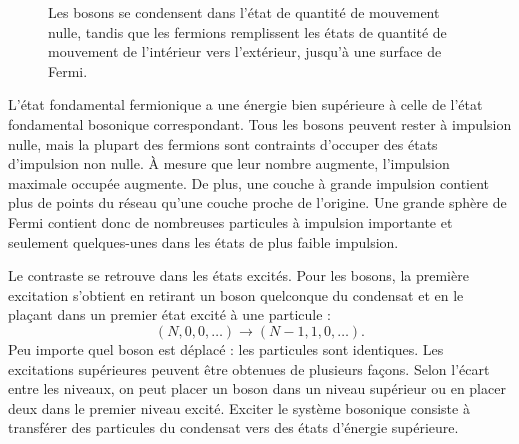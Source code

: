 \begin{figure}
\centering
{}
\caption{Les bosons se condensent dans l’état de quantité de mouvement nulle, tandis que les fermions remplissent les états de quantité de mouvement de l’intérieur vers l’extérieur, jusqu’à une surface de Fermi.}
\end{figure}

L’état fondamental fermionique a une énergie bien supérieure à celle de l’état fondamental bosonique correspondant. Tous les bosons peuvent rester à impulsion nulle, mais la plupart des fermions sont contraints d’occuper des états d’impulsion non nulle. À mesure que leur nombre augmente, l’impulsion maximale occupée augmente. De plus, une couche à grande impulsion contient plus de points du réseau qu’une couche proche de l’origine. Une grande sphère de Fermi contient donc de nombreuses particules à impulsion importante et seulement quelques-unes dans les états de plus faible impulsion.

Le contraste se retrouve dans les états excités. Pour les bosons, la première excitation s’obtient en retirant un boson quelconque du condensat et en le plaçant dans un premier état excité à une particule :
\begin{equation}
(N,0,0,\ldots)\longrightarrow (N-1,1,0,\ldots).
\end{equation}
Peu importe quel boson est déplacé : les particules sont identiques. Les excitations supérieures peuvent être obtenues de plusieurs façons. Selon l’écart entre les niveaux, on peut placer un boson dans un niveau supérieur ou en placer deux dans le premier niveau excité. Exciter le système bosonique consiste à transférer des particules du condensat vers des états d’énergie supérieure.


